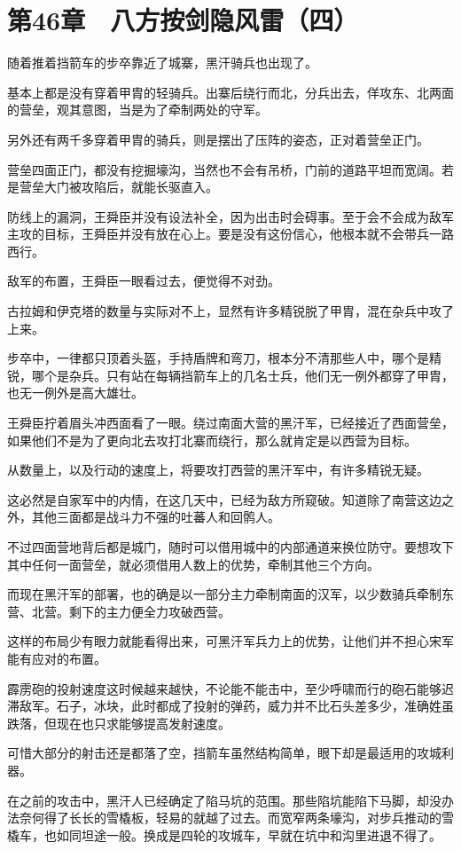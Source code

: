 \section{第46章　八方按剑隐风雷（四）}

随着推着挡箭车的步卒靠近了城寨，黑汗骑兵也出现了。

基本上都是没有穿着甲胄的轻骑兵。出寨后绕行而北，分兵出去，佯攻东、北两面的营垒，观其意图，当是为了牵制两处的守军。

另外还有两千多穿着甲胄的骑兵，则是摆出了压阵的姿态，正对着营垒正门。

营垒四面正门，都没有挖掘壕沟，当然也不会有吊桥，门前的道路平坦而宽阔。若是营垒大门被攻陷后，就能长驱直入。

防线上的漏洞，王舜臣并没有设法补全，因为出击时会碍事。至于会不会成为敌军主攻的目标，王舜臣并没有放在心上。要是没有这份信心，他根本就不会带兵一路西行。

敌军的布置，王舜臣一眼看过去，便觉得不对劲。

古拉姆和伊克塔的数量与实际对不上，显然有许多精锐脱了甲胄，混在杂兵中攻了上来。

步卒中，一律都只顶着头盔，手持盾牌和弯刀，根本分不清那些人中，哪个是精锐，哪个是杂兵。只有站在每辆挡箭车上的几名士兵，他们无一例外都穿了甲胄，也无一例外是高大雄壮。

王舜臣拧着眉头冲西面看了一眼。绕过南面大营的黑汗军，已经接近了西面营垒，如果他们不是为了更向北去攻打北寨而绕行，那么就肯定是以西营为目标。

从数量上，以及行动的速度上，将要攻打西营的黑汗军中，有许多精锐无疑。

这必然是自家军中的内情，在这几天中，已经为敌方所窥破。知道除了南营这边之外，其他三面都是战斗力不强的吐蕃人和回鹘人。

不过四面营地背后都是城门，随时可以借用城中的内部通道来换位防守。要想攻下其中任何一面营垒，就必须借用人数上的优势，牵制其他三个方向。

而现在黑汗军的部署，也的确是以一部分主力牵制南面的汉军，以少数骑兵牵制东营、北营。剩下的主力便全力攻破西营。

这样的布局少有眼力就能看得出来，可黑汗军兵力上的优势，让他们并不担心宋军能有应对的布置。

霹雳砲的投射速度这时候越来越快，不论能不能击中，至少呼啸而行的砲石能够迟滞敌军。石子，冰块，此时都成了投射的弹药，威力并不比石头差多少，准确姓虽跌落，但现在也只求能够提高发射速度。

可惜大部分的射击还是都落了空，挡箭车虽然结构简单，眼下却是最适用的攻城利器。

在之前的攻击中，黑汗人已经确定了陷马坑的范围。那些陷坑能陷下马脚，却没办法奈何得了长长的雪橇板，轻易的就越了过去。而宽窄两条壕沟，对步兵推动的雪橇车，也如同坦途一般。换成是四轮的攻城车，早就在坑中和沟里进退不得了。

